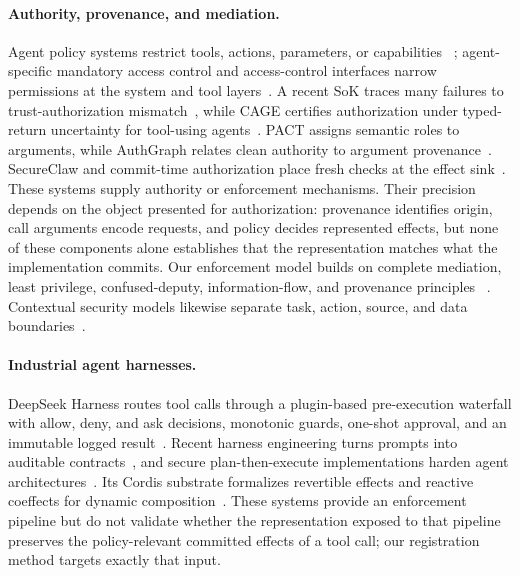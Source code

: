 \paragraph{Authority, provenance, and mediation.}
Agent policy systems restrict tools, actions, parameters, or capabilities
~\cite{progent,miniscope,clawguard,scopegate,agentguard}; agent-specific
mandatory access control and access-control interfaces narrow permissions at
the system and tool layers~\cite{ji2026taming,sharma2026ac4a}. A recent SoK
traces many failures to trust-authorization mismatch~\cite{shi2025soktrustauth},
while CAGE certifies authorization under typed-return uncertainty for
tool-using agents~\cite{delattre2026cage}. PACT assigns semantic
roles to arguments, while AuthGraph relates clean authority to argument
provenance~\cite{pact,authgraph}. SecureClaw and commit-time authorization place
fresh checks at the effect sink~\cite{secureclaw,committimeauth}. These systems
supply authority or enforcement mechanisms. Their precision depends on the
object presented for authorization: provenance identifies origin, call
arguments encode requests, and policy decides represented effects, but none of
these components alone establishes that the representation matches what the
implementation commits. Our enforcement model builds on complete mediation,
least privilege, confused-deputy, information-flow, and provenance principles
~\cite{saltzer1975protection,dennis1966programming,hardy1988confused,denning1976lattice,buneman2001why,cheney2009provenance}.
Contextual security models likewise separate task, action, source, and data
boundaries~\cite{siu2026formalizing}.

\paragraph{Industrial agent harnesses.}
DeepSeek Harness routes tool calls through a plugin-based pre-execution
waterfall with allow, deny, and ask decisions, monotonic guards, one-shot
approval, and an immutable logged result~\cite{deepseekharness2026}. Recent harness
engineering turns prompts into auditable contracts~\cite{ahn2026promptscontracts},
and secure plan-then-execute implementations harden agent
architectures~\cite{delrosario2025architecting}. Its
Cordis substrate formalizes revertible effects and reactive coeffects for
dynamic composition~\cite{shi2026spatiotemporal}. These systems provide an
enforcement pipeline but do not validate whether the representation exposed
to that pipeline preserves the policy-relevant committed effects of a tool
call; our registration method targets exactly that input.

